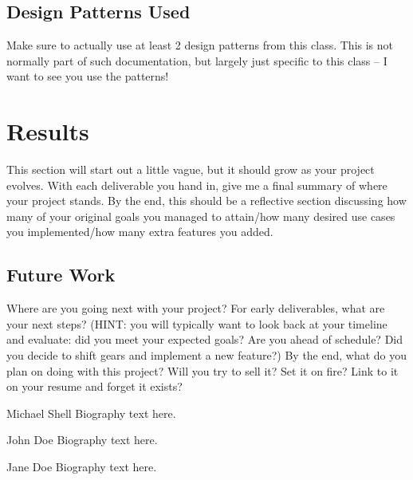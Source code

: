 \documentclass[10pt,conference,onecolumn,compsoc]{IEEEtran}
\begin{document}


\subsection{Design Patterns Used}
Make sure to actually use at least 2 design patterns from this class.  This is not normally part of such documentation, but largely just specific to this class -- I want to see you use the patterns!


\section{Results}
This section will start out a little vague, but it should grow as your project evolves.  With each deliverable you hand in, give me a final summary of where your project stands.  By the end, this should be a reflective section discussing how many of your original goals you managed to attain/how many desired use cases you implemented/how many extra features you added.

\subsection{Future Work}
Where are you going next with your project?
For early deliverables, what are your next steps?  (HINT: you will typically want to look back at your timeline and evaluate: did you meet your expected goals?  Are you ahead of schedule?  Did you decide to shift gears and implement a new feature?)
By the end, what do you plan on doing with this project?  Will you try to sell it?  Set it on fire?  Link to it on your resume and forget it exists?


\begin{IEEEbiography}{Michael Shell}
Biography text here.
\end{IEEEbiography}

\begin{IEEEbiographynophoto}{John Doe}
Biography text here.
\end{IEEEbiographynophoto}

\begin{IEEEbiographynophoto}{Jane Doe}
Biography text here.
\end{IEEEbiographynophoto}
\end{document}
